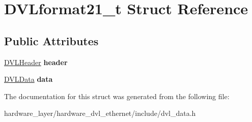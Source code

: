 \hypertarget{structDVLformat21__t}{}\section{D\+V\+Lformat21\+\_\+t Struct Reference}
\label{structDVLformat21__t}
\subsection*{Public Attributes}
\begin{DoxyCompactItemize}
\item 
\mbox{\label{structDVLformat21__t_a73ccb6a2f243fcb72d17fb50b0f06268}} 
\hyperlink{structDVLHeader}{D\+V\+L\+Header} {\bfseries header}
\item 
\mbox{\label{structDVLformat21__t_aadedba2c0c9ae4ba1207402182b1039c}} 
\hyperlink{structDVLData}{D\+V\+L\+Data} {\bfseries data}
\end{DoxyCompactItemize}


The documentation for this struct was generated from the following file\+:\begin{DoxyCompactItemize}
\item 
hardware\+\_\+layer/hardware\+\_\+dvl\+\_\+ethernet/include/dvl\+\_\+data.\+h\end{DoxyCompactItemize}
